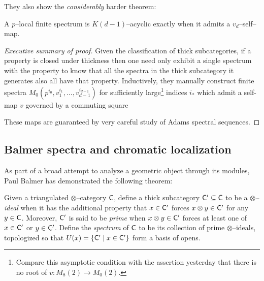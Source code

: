 They also show the \emph{considerably} harder theorem:

\begin{theorem}
A $p$--local finite spectrum is $K(d-1)$--acyclic exactly when it admits a $v_d$--self--map.
\end{theorem}
\begin{proof}[Executive summary of proof]
Given the classification of thick subcategories, if a property is closed under thickness then one need only exhibit a single spectrum with the property to know that all the spectra in the thick subcategory it generates also all have that property.  Inductively, they manually construct finite spectra $M_0(p^{i_0}, v_1^{i_1}, \ldots, v_{d-1}^{i_{d-1}})$ for sufficiently large\footnote{Compare this asymptotic condition with the assertion yesterday that there is no root of $v: M_8(2) \to M_0(2)$.} indices $i_*$ which admit a self-map $v$ governed by a commuting square
\begin{center}
\end{center}
These maps are guaranteed by very careful study of Adams spectral sequences.
\end{proof}


\subsection{Balmer spectra and chromatic localization}

As part of a broad attempt to analyze a geometric object through its modules, Paul Balmer has demonstrated the following theorem:

\begin{definition}
Given a triangulated $\otimes$--category $\mathsf{C}$, define a thick subcategory $\mathsf{C}' \subseteq \mathsf{C}$ to be a \textit{$\otimes$--ideal} when it has the additional property that $x \in \mathsf{C}'$ forces $x \otimes y \in \mathsf{C}'$ for any $y \in \mathsf{C}$.  Moreover, $\mathsf{C}'$ is said to be \textit{prime} when $x \otimes y \in \mathsf{C}'$ forces at least one of $x \in \mathsf{C}'$ or $y \in \mathsf{C}'$.  Define the \textit{spectrum} of $\mathsf{C}$ to be its collection of prime $\otimes$--ideals, topologized so that $U(x) = \{\mathsf{C}' \mid x \in \mathsf{C}'\}$ form a basis of opens.
\end{definition}

